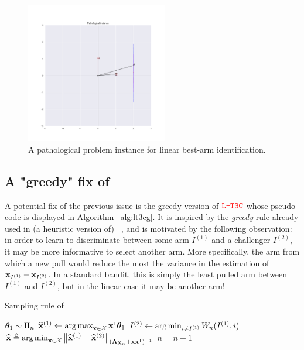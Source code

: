 \begin{figure}[ht]
    \centering
    \includegraphics[width=0.55\textwidth]{Chapter4/img/instance.pdf}
    \caption{A pathological problem instance for linear best-arm identification.}
    \label{fig:instance}
\end{figure}

\subsection{A "greedy" fix of \LTCC{}}\label{sec:lgc.bayesian.fix}

A potential fix of the previous issue is the greedy version of $\textcolor{red}{\texttt{L-T3C}}$ whose pseudo-code is displayed in Algorithm~\ref{alg:lt3cg}. It is inspired by the \emph{greedy} rule already used in (a heuristic version of) \LGapE~\citep{xu2018linear}, and is motivated by the following observation: in order to learn to discriminate between some arm $I^{(1)}$ and a challenger $I^{(2)}$, it may be more informative to select another arm. More specifically, the arm from which a new pull would reduce the most the variance in the estimation of ${\bf x}_{I^{(1)}} - {\bf x}_{I^{(2)}}$. In a standard bandit, this is simply the least pulled arm between $I^{(1)}$ and $I^{(2)}$, but in the linear case it may be another arm!

\begin{algorithm}[ht]
\centering
\caption{Sampling rule of \LTCCG{}}
\label{alg:lt3cg}
\begin{algorithmic}[1]
        \State {} ${\boldsymbol \theta}_1 \sim \Pi_n$
        \State $\widehat{{\bf x}}^{(1)} \leftarrow \operatorname*{arg\,max}_{{\bf x}\in\mathcal{X}} {\bf x}^\mathsf{\scriptscriptstyle T}{\boldsymbol \theta}_1$ 
	        \State $I^{(2)} \leftarrow \operatorname*{arg\,min}_{i\neq I^{(1)}}W_n(I^{(1)},i)$ 
		    \State {} $\widehat{{\bf x}} \triangleq \operatorname*{arg\,min}_{{\bf x}\in\mathcal{X}} \left\lVert\widehat{{\bf x}}^{(1)} - \widehat{{\bf x}}^{(2)}\right\rVert_{({\bf A}_{{\bf X}_n}+{\bf x}{\bf x}^\mathsf{\scriptscriptstyle T})^{-1}}$
	    \State {}
	    \State $n = n+1$
   \EndFor
\end{algorithmic}
\end{algorithm}

